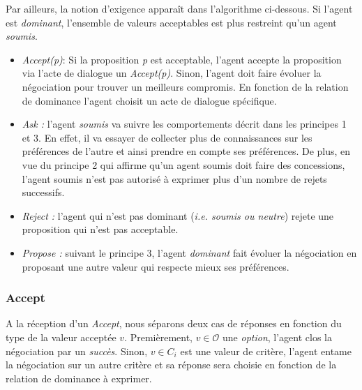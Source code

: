 	Par ailleurs, la notion d'exigence apparaît dans l'algorithme ci-dessous. Si l'agent est \emph{dominant}, l'ensemble de valeurs acceptables est plus restreint qu'un agent \emph{soumis}.

	\begin{itemize}
		
		\item  \emph{Accept(p)}: Si la proposition \emph{p} est acceptable, l'agent accepte la proposition via l'acte de dialogue un \emph{Accept(p)}. Sinon, l'agent doit faire évoluer la négociation pour trouver un meilleurs compromis. En fonction de la relation de dominance l'agent choisit un acte de dialogue spécifique.
		\item \emph{Ask :} l'agent \emph{soumis} va suivre les comportements décrit dans les principes 1 et 3. En effet, il va essayer de collecter plus de connaissances sur les préférences de l'autre et ainsi prendre en compte ses préférences. De plus, en vue du principe 2 qui affirme qu'un agent soumis doit faire des concessions, l'agent soumis n'est pas autorisé à exprimer plus d'un nombre de rejets successifs.  
		\item \emph{Reject :} l'agent qui n'est pas dominant (\emph{i.e. soumis ou neutre}) rejete une proposition qui n'est pas acceptable.
		\item \emph{Propose :} suivant le principe 3, l'agent \emph{dominant} fait évoluer la négociation en proposant une autre valeur qui respecte mieux ses préférences. 
	\end{itemize}
	
	\subsubsection{Accept }
	A la réception	d'un \emph{Accept}, nous séparons deux cas de réponses en fonction du type de la valeur acceptée $v$.
	Premièrement, $ v \in \mathcal{O}$ une \textit{option}, l'agent clos la négociation par un \emph{succès}.
	Sinon, $v \in C_i$ est une valeur de critère, l'agent entame la négociation sur un autre critère et sa réponse sera choisie en fonction de la relation de dominance à exprimer.
	
